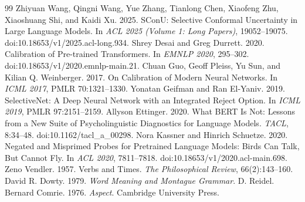\begin{thebibliography}{99}
 Zhiyuan Wang, Qingni Wang, Yue Zhang, Tianlong Chen, Xiaofeng Zhu, Xiaoshuang Shi, and Kaidi Xu. 2025. SConU: Selective Conformal Uncertainty in Large Language Models. In \emph{ACL 2025 (Volume 1: Long Papers)}, 19052--19075. doi:10.18653/v1/2025.acl-long.934.
 Shrey Desai and Greg Durrett. 2020. Calibration of Pre-trained Transformers. In \emph{EMNLP 2020}, 295--302. doi:10.18653/v1/2020.emnlp-main.21.
 Chuan Guo, Geoff Pleiss, Yu Sun, and Kilian Q. Weinberger. 2017. On Calibration of Modern Neural Networks. In \emph{ICML 2017}, PMLR 70:1321--1330.
 Yonatan Geifman and Ran El-Yaniv. 2019. SelectiveNet: A Deep Neural Network with an Integrated Reject Option. In \emph{ICML 2019}, PMLR 97:2151--2159.
 Allyson Ettinger. 2020. What BERT Is Not: Lessons from a New Suite of Psycholinguistic Diagnostics for Language Models. \emph{TACL}, 8:34--48. doi:10.1162/tacl\_a\_00298.
 Nora Kassner and Hinrich Schuetze. 2020. Negated and Misprimed Probes for Pretrained Language Models: Birds Can Talk, But Cannot Fly. In \emph{ACL 2020}, 7811--7818. doi:10.18653/v1/2020.acl-main.698.
 Zeno Vendler. 1957. Verbs and Times. \emph{The Philosophical Review}, 66(2):143--160.
 David R. Dowty. 1979. \emph{Word Meaning and Montague Grammar}. D. Reidel.
 Bernard Comrie. 1976. \emph{Aspect}. Cambridge University Press.
\end{thebibliography}
